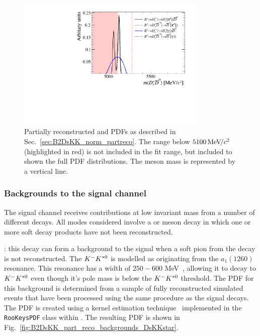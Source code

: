 \begin{figure}[!h]
    \centering
    \includegraphics[width=0.80\textwidth]{figs/B2DsKK/B2DsKK_DsD0_part_reco_Shapes.pdf}
    \caption{Partially reconstructed \decay{\Bp}{\Dssp\Dzb} and \decay{\Bp}{\Dsp\Dstarzb} PDFs as described in Sec.~\ref{sec:B2DsKK_norm_partreco}. The range below $5100{\mathrm{\,Me\kern -0.1em V\!/}c^2}$ (highlighted in red) is not included in the fit range, but included to shown the full PDF distributions. The \Bp meson mass is represented by a vertical line.} 
    \label{fig:B2DsKK_DsD0_partreco}   
\end{figure}





\subsubsection{Backgrounds to the signal channel}

The signal channel receives contributions at low invariant mass from a number of different decays. 
All modes considered involve a \Bs or \Bz meson decay in which one or more soft decay products have not been reconstructed.

\begin{description}
\item \decay{\Bsb}{\Dsp\Km\Kstarz}: this decay can form a background to the \decay{\Bp}{\Dsp\Kp\Km} signal when a soft pion from the \decay{\Kstarz}{\Kp\pim} decay is not reconstructed. The ${{K}^-}{{K}^{*0}}$ is modelled as originating from the $a_1(1260)$ resonance. This resonance has a width of $250-600$ MeV~\cite{PDG2016}, allowing it to decay to ${{K}^-}{{K}^{*0}}$ even though it's pole mass is below the ${{K}^-}{{K}^{*0}}$ threshold.
The PDF for this background is determined from a sample of fully reconstructed simulated events that have been processed using the same procedure as the signal decays. The PDF is created using a kernel estimation technique~\cite{Cranmer:2000du} implemented in the \texttt{RooKeysPDF} class within \roofit. The resulting PDF is shown in Fig.~\ref{fig:B2DsKK_part_reco_backgrounds_DsKKstar}.
\end{description}

